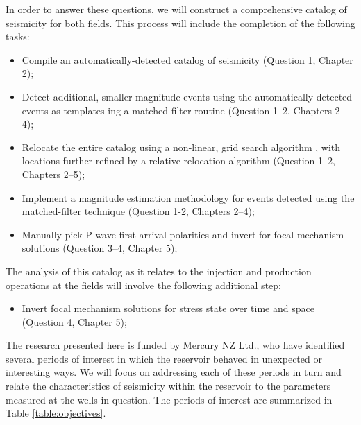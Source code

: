 In order to answer these questions, we will construct a comprehensive catalog of seismicity for both fields. This process will include the completion of the following tasks:
\begin{itemize}
  \item{Compile an automatically-detected catalog of seismicity (Question 1, Chapter 2);}
  \item{Detect additional, smaller-magnitude events using the automatically-detected events as templates ing a matched-filter routine \citep{Chamberlain_2017} (Question 1--2, Chapters 2--4);}
  \item{Relocate the entire catalog using a non-linear, grid search algorithm \citep{Lomax_2014}, with locations further refined by a relative-relocation algorithm \citep{Trugman_2017} (Question 1--2, Chapters 2--5);}
  \item{Implement a magnitude estimation methodology \citep{Shelly_2016} for events detected using the matched-filter technique (Question 1-2, Chapters 2--4);}
  \item{Manually pick P-wave first arrival polarities and invert for focal mechanism solutions \cite{Walsh_2009} (Question 3--4, Chapter 5);}
\end{itemize}

The analysis of this catalog as it relates to the injection and production operations at the fields will involve the following additional step:
\begin{itemize}
  \item{Invert focal mechanism solutions for stress state over time and space \citep{Arnold_2007,Lund_2007} (Question 4, Chapter 5);}
\end{itemize}

The research presented here is funded by Mercury NZ Ltd., who have identified several periods of interest in which the reservoir behaved in unexpected or interesting ways. We will focus on addressing each of these periods in turn and relate the characteristics of seismicity within the reservoir to the parameters measured at the wells in question. The periods of interest are summarized in Table \ref{table:objectives}.

